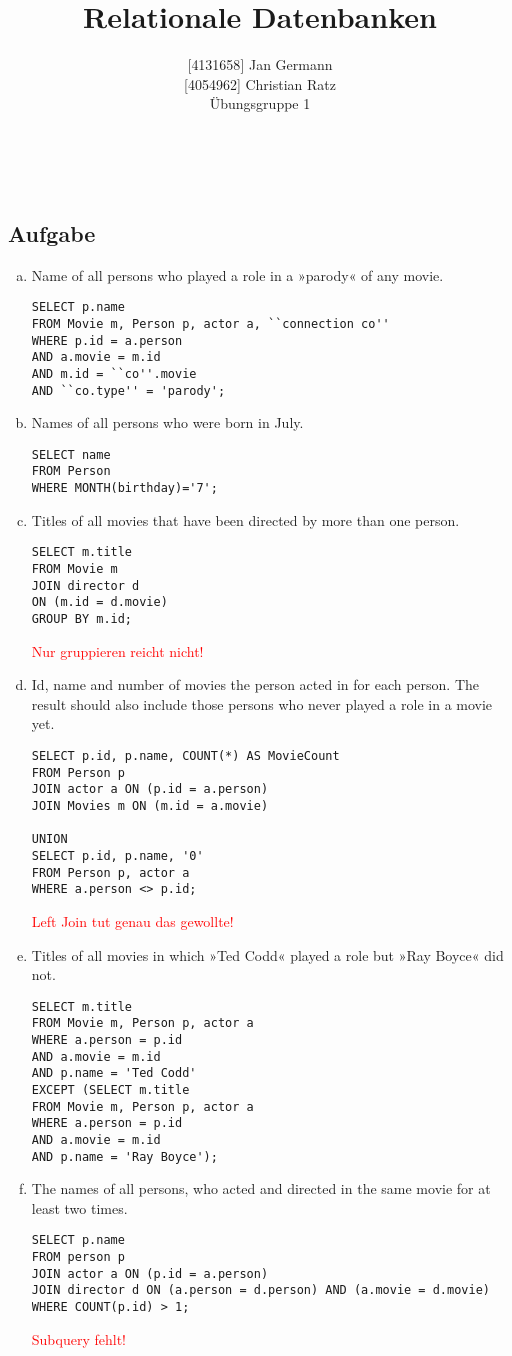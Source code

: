 \documentclass[11pt,a4paper,DIV=9]{scrartcl}
\author{{[}4131658{]} Jan Germann \\{[}4054962{]} Christian Ratz\\Übungsgruppe 1}
\title{Relationale Datenbanken}
\newcounter{temp}
\newcommand{\aufgabe}[1]{
  \setcounter{temp}{\value{subsection}}
  \setcounter{subsection}{#1}
  \addtocounter{subsection}{-1}
  \subsection{Aufgabe}
  \setcounter{subsection}{\value{temp}}
}
\renewcommand{\author}[1]{\renewcommand{\author}{#1}}
\renewcommand{\title}[1]{\renewcommand{\title}{#1}}
\newcommand{\makehomeworktitle}{
  \begin{minipage}[t]{6.5cm}
    \sf{\author}
  \end{minipage}
  \begin{minipage}[t]{6.5cm}
    \begin{flushright}
      \sf{\title\\\today}
    \end{flushright}
  \end{minipage}
  \\[0.2cm]
  \begin{center}
    \sf{
      \color{blue}{
        \LARGE{Aufgabenblatt \blattnr}
      }
    }
  \end{center}
  \vspace{0.1cm}
}
\begin{document}
\makehomeworktitle
\aufgabe{1}
  \begin{enumerate}[a.]
      \item Name of all persons who played a role in a »parody« of any movie.\hfill
\begin{lstlisting}
SELECT p.name
FROM Movie m, Person p, actor a, ``connection co''
WHERE p.id = a.person
AND a.movie = m.id
AND m.id = ``co''.movie
AND ``co.type'' = 'parody';
\end{lstlisting}

      \item Names of all persons who were born in July.\hfill\\
\begin{lstlisting}
SELECT name 
FROM Person 
WHERE MONTH(birthday)='7';
\end{lstlisting}

      \item Titles of all movies that have been directed by more than one person.\hfill\\
\begin{lstlisting}
SELECT m.title 
FROM Movie m 
JOIN director d 
ON (m.id = d.movie) 
GROUP BY m.id; 
\end{lstlisting}
\textcolor{red}{Nur gruppieren reicht nicht!}

      \item Id, name and number of movies the person acted in for each person. The result should also include those persons who never played a role in a movie yet.\hfill
\begin{lstlisting}
SELECT p.id, p.name, COUNT(*) AS MovieCount 
FROM Person p 
JOIN actor a ON (p.id = a.person) 
JOIN Movies m ON (m.id = a.movie) 

UNION
SELECT p.id, p.name, '0' 
FROM Person p, actor a 
WHERE a.person <> p.id;
\end{lstlisting}
\textcolor{red}{Left Join tut genau das gewollte!}

      \item Titles of all movies in which »Ted Codd« played a role but »Ray Boyce« did not.\hfill
\begin{lstlisting}
SELECT m.title 
FROM Movie m, Person p, actor a  
WHERE a.person = p.id 
AND a.movie = m.id 
AND p.name = 'Ted Codd' 
EXCEPT (SELECT m.title 
FROM Movie m, Person p, actor a 
WHERE a.person = p.id 
AND a.movie = m.id 
AND p.name = 'Ray Boyce');
\end{lstlisting}


      \item The names of all persons, who acted and directed in the same movie for at least two times.\hfill
\begin{lstlisting}
SELECT p.name 
FROM person p 
JOIN actor a ON (p.id = a.person) 
JOIN director d ON (a.person = d.person) AND (a.movie = d.movie) 
WHERE COUNT(p.id) > 1;
\end{lstlisting}
 \textcolor{red}{Subquery fehlt!}


\end{enumerate}
\end{document}
